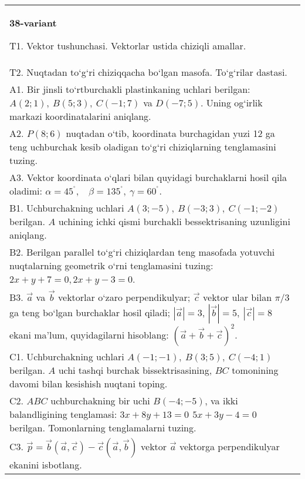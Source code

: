 \documentclass{article}
\begin{document}
\begin{tabular}{m{17cm}}
\textbf{38-variant}
\newline

T1. 
Vektor tushunchasi. Vektorlar ustida chiziqli amallar.
 \\
T2. 
Nuqtadan to‘g‘ri chiziqqacha bo‘lgan masofa. To‘g‘rilar dastasi.
 \\
A1. 
Bir jinsli to‘rtburchakli plastinkaning uchlari berilgan:
$A (2;1), \ B (5;3), \ C (-1;7) $ va $D (-7;5) $. Uning og‘irlik markazi
koordinatalarini aniqlang.
 \\
A2. 
$P (8;6) $ nuqtadan o‘tib, koordinata burchagidan
yuzi 12 ga teng uchburchak kesib oladigan to‘g‘ri chiziqlarning tenglamasini
tuzing.
 \\
A3. 
Vektor koordinata o‘qlari bilan quyidagi burchaklarni hosil qila oladimi:
$\alpha = 45^{{^\circ}},\ \ \ \ \beta = 135^{{^\circ}},\ \gamma = 60^{{^\circ}}$.
 \\
B1. 
Uchburchakning uchlari
\(A (3;-5),\ B (-3;3),\ C (-1;-2) \) berilgan. $A$ uchining ichki qismi
burchakli bessektrisaning uzunligini aniqlang.
 \\
B2. 
Berilgan parallel to‘g‘ri chiziqlardan teng masofada yotuvchi
nuqtalarning geometrik o‘rni tenglamasini tuzing: $2x+y+7=0, 2x+y-3=0$.
 \\
B3. 
$\vec{a}$ va $\vec{b}$ vektorlar o‘zaro perpendikulyar; $\vec{c}$ vektor ular bilan $\pi/3$ ga teng bo‘lgan burchaklar hosil qiladi; $|\vec{a}| = 3$, $|\vec{b}| = 5,\ |\vec{c}| = 8$ ekani ma’lum, quyidagilarni hisoblang:
$ (\vec{a} + \vec{b} + \vec{c}) ^{2}$.
 \\
C1. 
Uchburchakning uchlari
\(A (- 1; - 1),\ B (3;5),\ C (- 4;1) \) berilgan. $A$ uchi tashqi
burchak bissektrisasining, $BC$ tomonining davomi bilan kesishish
nuqtani toping.
 \\
C2. 
$ABC$ uchburchakning bir uchi \(B (- 4; - 5) \),
va ikki balandligining tenglamasi:
\(3x + 8y + 13 = 0\,\ 5x + 3y - 4 = 0\) berilgan. Tomonlarning
tenglamalarni tuzing.
 \\
C3. 
\(\vec{p} = \vec{b} (\vec{a},\vec{c}) - \vec{c} (\vec{a},\vec{b}) \) vektor \(\vec{a}\) vektorga perpendikulyar ekanini isbotlang.
 \\

\end{tabular}
\vspace{1cm}
\end{document}
